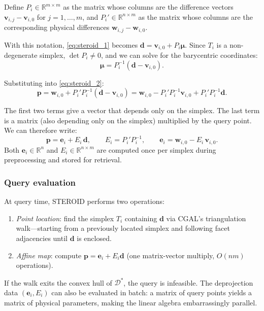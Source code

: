 \documentclass[review,onefignum,onetabnum]{./SIAM_template/siamart171218}
\begin{document}
Define $P_i \in \mathbb{R}^{m \times m}$ as the matrix whose columns are the
difference vectors $\mathbf{v}_{i,j} - \mathbf{v}_{i,0}$ for $j=1,\ldots,m$,
and $P_i' \in \mathbb{R}^{n \times m}$ as the matrix whose columns are the
corresponding physical differences
$\mathbf{w}_{i,j} - \mathbf{w}_{i,0}$.

With this notation, \eqref{eq:steroid_1} becomes
$\mathbf{d} = \mathbf{v}_{i,0} + P_i \boldsymbol{\mu}$.
Since $T_i$ is a non-degenerate simplex, $\det P_i \neq 0$, and we can solve
for the barycentric coordinates:
\begin{equation}
	\label{eq:steroid_mu}
	\boldsymbol{\mu} = P_i^{-1}(\mathbf{d} - \mathbf{v}_{i,0}).
\end{equation}

Substituting into \eqref{eq:steroid_2}:
\begin{equation}
	\label{eq:steroid_expand}
	\mathbf{p} = \mathbf{w}_{i,0} + P_i' P_i^{-1}(\mathbf{d} - \mathbf{v}_{i,0})
	= \mathbf{w}_{i,0} - P_i' P_i^{-1}\mathbf{v}_{i,0} + P_i' P_i^{-1} \mathbf{d}.
\end{equation}

The first two terms give a vector that depends only on the simplex.  The last
term is a matrix (also depending only on the simplex) multiplied by the query
point.  We can therefore write:
\begin{equation}
	\label{eq:steroid_final}
	\mathbf{p} = \mathbf{e}_i + E_i\,\mathbf{d}, \qquad
	E_i = P_i' P_i^{-1}, \qquad
	\mathbf{e}_i = \mathbf{w}_{i,0} - E_i\,\mathbf{v}_{i,0}.
\end{equation}
Both $\mathbf{e}_i \in \mathbb{R}^n$ and $E_i \in \mathbb{R}^{n \times m}$ are
computed once per simplex during preprocessing and stored for retrieval.

\subsubsection{Query evaluation}

At query time, STEROID performs two operations:
\begin{enumerate}
	\item \emph{Point location}: find the simplex $T_i$ containing $\mathbf{d}$
	      via CGAL's triangulation walk---starting from a previously located simplex
	      and following facet adjacencies until $\mathbf{d}$ is enclosed.
	\item \emph{Affine map}: compute $\mathbf{p} = \mathbf{e}_i + E_i \mathbf{d}$
	      (one matrix-vector multiply, $O(nm)$ operations).
\end{enumerate}
If the walk exits the convex hull of $\mathcal{D}^*$, the query is infeasible.
The deprojection data $(\mathbf{e}_i, E_i)$ can also be evaluated in batch:
a matrix of query points yields a matrix of physical parameters, making the
linear algebra embarrassingly parallel.
\end{document}
